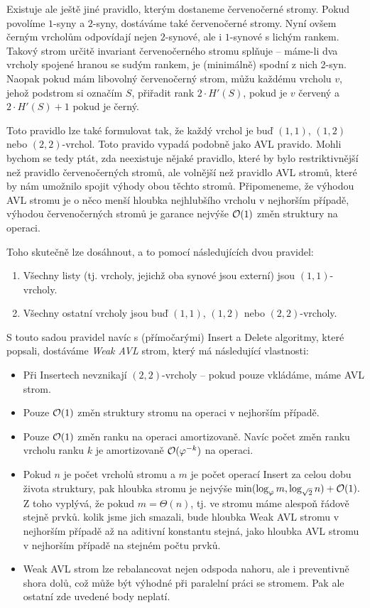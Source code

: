 Existuje ale ještě jiné pravidlo, kterým dostaneme červenočerné stromy. Pokud povolíme $1$-syny a $2$-syny, dostáváme také červenočerné stromy. Nyní ovšem černým vrcholům odpovídají nejen $2$-synové, ale i $1$-synové s lichým rankem. Takový strom určitě invariant červenočerného stromu splňuje -- máme-li dva vrcholy spojené hranou se sudým rankem, je (minimálně) spodní z nich 2-syn. Naopak pokud mám libovolný červenočerný strom, můžu každému vrcholu $v$, jehož podstrom si označím $S$, přiřadit rank $2\cdot H'(S)$, pokud je $v$ červený a $2\cdot H'(S) + 1$ pokud je černý.

Toto pravidlo lze také formulovat tak, že každý vrchol je buď $(1,1)$, $(1,2)$ nebo $(2,2)$-vrchol. Toto pravido vypadá podobně jako AVL pravido. Mohli bychom se tedy ptát, zda neexistuje nějaké pravidlo, které by bylo restriktivnější než pravidlo červenočerných stromů, ale volnější než pravidlo AVL stromů, které by nám umožnilo spojit výhody obou těchto stromů. Připomeneme, že výhodou AVL stromu je o něco menší hloubka nejhlubšího vrcholu v nejhorším případě, výhodou červenočerných stromů je garance nejvýše $\mathcal O(1)$ změn struktury na operaci. 

Toho skutečně lze dosáhnout, a to pomocí následujících dvou pravidel:
\begin{enumerate}
\item Všechny listy (tj. vrcholy, jejichž oba synové jsou externí) jsou $(1,1)$-vrcholy.
\item Všechny ostatní vrcholy jsou buď $(1,1)$, $(1,2)$ nebo $(2,2)$-vrcholy.
\end{enumerate}

S touto sadou pravidel navíc s (přímočarými) Insert a Delete algoritmy, které \citet{rankbalanced} popsali, dostáváme \emph{Weak AVL} strom, který má následující vlastnosti:

\begin{itemize}
\item Při Insertech nevznikají $(2,2)$-vrcholy -- pokud pouze vkládáme, máme AVL strom.
\item Pouze $\mathcal O(1)$ změn struktury stromu na operaci v nejhorším případě.
\item Pouze $\mathcal O(1)$ změn ranku na operaci amortizovaně. Navíc počet změn ranku vrcholu ranku $k$ je amortizovaně $\mathcal O(\varphi^{-k})$ na operaci.
\item Pokud $n$ je počet vrcholů stromu a $m$ je počet operací Insert za celou dobu života struktury, pak hloubka stromu je nejvýše $\min(\log_{\varphi} m, \log_{\sqrt2} n) + \mathcal O(1).$ Z toho vyplývá, že pokud $m=\Theta(n)$, tj. ve stromu máme alespoň řádově stejně prvků. kolik jsme jich smazali, bude hloubka Weak AVL stromu v nejhorším případě až na aditivní konstantu stejná, jako hloubka AVL stromu v nejhorším případě na stejném počtu prvků.
\item Weak AVL strom lze rebalancovat nejen odspoda nahoru, ale i preventivně shora dolů, což může být výhodné při paralelní práci se stromem. Pak ale ostatní zde uvedené body neplatí.
\end{itemize}



